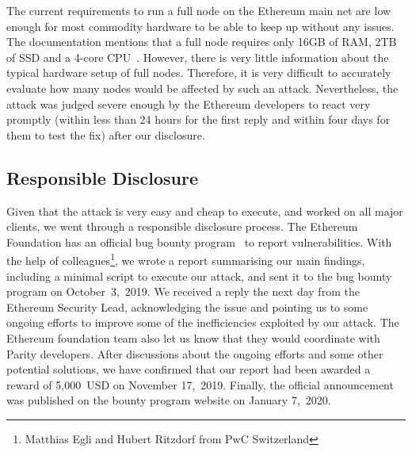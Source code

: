 The current requirements to run a full node on the Ethereum main net are low enough for most commodity hardware to be able to keep up without any issues.
The documentation mentions that a full node requires only 16GB of RAM, 2TB of SSD and a 4-core CPU~\cite{ethereum-docs-hardware-requirement}.
However, there is very little information about the typical hardware setup of full nodes.
Therefore, it is very difficult to accurately evaluate how many nodes would be affected by such an attack.
Nevertheless, the attack was judged severe enough by the Ethereum developers to react very promptly (within less than 24 hours for the first reply and within four days for them to test the fix) after our disclosure.

\subsection{Responsible Disclosure}
\label{sec:3:responsible}
Given that the attack is very easy and cheap to execute, and worked on all major clients, we went through a responsible disclosure process. The Ethereum Foundation has an official bug bounty program~\cite{ethereum-bug-bounty} to report vulnerabilities. With the help of colleagues\footnote{Matthias Egli and Hubert Ritzdorf from PwC Switzerland}, we wrote a report summarising our main findings, including a minimal script to execute our attack, and sent it to the bug bounty program on October~3,~2019. We received a reply the next day from the Ethereum Security Lead, acknowledging the issue and pointing us to some ongoing efforts to improve some of the inefficiencies exploited by our attack. The Ethereum foundation team also let us know that they would coordinate with Parity developers. After discussions about the ongoing efforts and some other potential solutions, we have confirmed that our report had been awarded a reward of 5,000~USD on November 17,~2019. Finally, the official announcement was published on the bounty program website on January 7,~2020.

